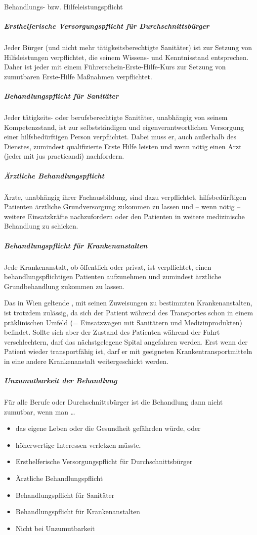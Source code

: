 \TextSlide
{Behandlungs- bzw. Hilfeleistungspflicht}
{
\subparagraph{Ersthelferische Versorgungspflicht für
Durchschnittsbürger} Jeder Bürger (und nicht mehr
tätigkeitsberechtigte Sanitäter) ist zur Setzung von
Hilfsleistungen verpflichtet, die seinem Wissens- und
Kenntnisstand entsprechen. Daher ist jeder mit einem
Führerschein-Erste-Hilfe-Kurs zur Setzung von zumutbaren
Erste-Hilfe Maßnahmen verpflichtet.

\subparagraph{Behandlungspflicht für Sanitäter}
Jeder tätigkeits- oder berufsberechtigte Sanitäter,
unabhängig von seinem Kompetenzstand, ist zur
selbstständigen und eigenverantwortlichen Versorgung einer
hilfsbedürftigen Person verpflichtet. Dabei muss er, auch
außerhalb des Dienstes, zumindest qualifizierte Erste Hilfe
leisten und wenn nötig einen Arzt (jeder mit jus
practicandi) nachfordern.

\subparagraph{Ärztliche Behandlungspflicht}
Ärzte, unabhängig ihrer Fachausbildung, sind dazu
verpflichtet, hilfsbedürftigen Patienten ärztliche
Grundversorgung zukommen zu lassen und -- wenn nötig --
weitere Einsatzkräfte nachzufordern oder den Patienten in
weitere medizinische Behandlung zu
schicken.

\subparagraph{Behandlungspflicht für Krankenanstalten}
Jede Krankenanstalt, ob öffentlich oder privat, ist
verpflichtet, einen behandlungspflichtigen Patienten 
aufzunehmen und zumindest ärztliche Grundbehandlung zukommen
zu lassen.

Das in Wien geltende , mit seinen
Zuweisungen zu bestimmten Krankenanstalten, ist trotzdem
zulässig, da sich der Patient während des Transportes schon
in einem präklinischen Umfeld (= Einsatzwagen mit Sanitätern
und Medizinprodukten) befindet. Sollte sich aber der Zustand
des Patienten während der Fahrt verschlechtern, darf das
nächstgelegene Spital angefahren werden.
Erst wenn der Patient wieder transportfähig ist, darf er mit
geeigneten Krankentransportmitteln in eine andere
Krankenanstalt weitergeschickt werden.

\subparagraph{Unzumutbarkeit der Behandlung}
Für alle Berufe oder Durchschnittsbürger ist die Behandlung
dann nicht zumutbar, wenn man \ldots
\begin{itemize}
  \item das eigene Leben oder die Gesundheit gefährden würde, oder
  \item höherwertige Interessen verletzen
  müsste.
\end{itemize}

}
{%
\begin{itemize}
  \item Ersthelferische Versorgungspflicht für
  Durchschnittsbürger
  \item Ärztliche Behandlungspflicht
  \item Behandlungspflicht für Sanitäter 
  \item Behandlungspflicht für Krankenanstalten
  \item Nicht bei Unzumutbarkeit
\end{itemize}}
{}
{}
{}

